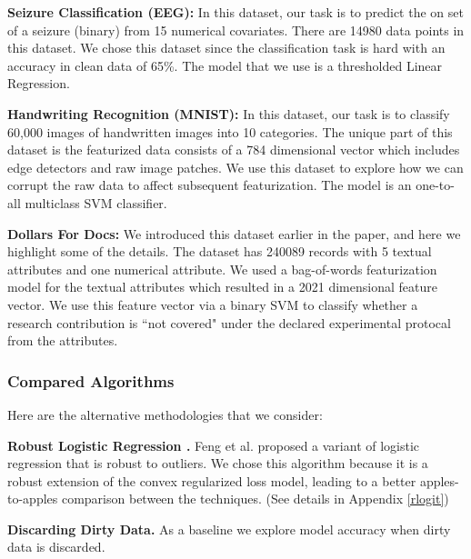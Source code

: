 \noindent\textbf{Seizure Classification (EEG): } In this dataset, our task is to predict the on set of a seizure (binary) from 15 numerical covariates. There are 14980 data points in this dataset. We chose this dataset since the classification task is hard with an accuracy in clean data of 65\%. The model that we use is a thresholded Linear Regression.

\vspace{0.25em}

\noindent\textbf{Handwriting Recognition (MNIST): } In this dataset, our task is to classify 60,000 images of handwritten images into 10 categories. The unique part of this dataset is the featurized data consists of a 784 dimensional vector which includes edge detectors and raw image patches. We use this dataset to explore how we can corrupt the raw data to affect subsequent featurization. The model is an one-to-all multiclass SVM classifier. 

\vspace{0.25em}

\noindent\textbf{Dollars For Docs: } We introduced this dataset earlier in the paper, and here we highlight some of the details. The dataset has 240089 records with 5 textual attributes and one numerical attribute.
We used a bag-of-words featurization model for the textual attributes which resulted in a 2021 dimensional feature vector. 
We use this feature vector via a binary SVM to classify whether a research contribution is ``not covered" under the declared experimental protocal from the attributes.

\subsubsection{Compared Algorithms}
\noindent Here are the alternative methodologies that we consider:

\vspace{0.25em}

\noindent\textbf{Robust Logistic Regression \cite{feng2014robust}. } Feng et al. proposed a variant of logistic regression that is robust to outliers. We chose this algorithm because it is a robust extension of the convex regularized loss model, leading to a better apples-to-apples comparison between the techniques. (See details in Appendix \ref{rlogit})  

\vspace{0.25em}

\noindent\textbf{Discarding Dirty Data. } As a baseline we explore model accuracy when dirty data is discarded.

